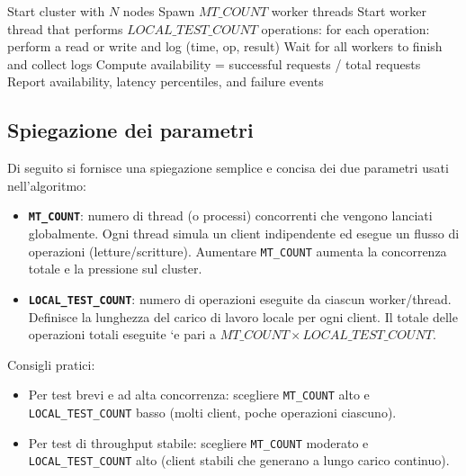 \documentclass{article}
\begin{document}
\begin{algorithm}
\caption{Availability Test (simplified)}
\begin{algorithmic}[1]
    \State Start cluster with $N$ nodes
    \State Spawn $MT\_COUNT$ worker threads
        \State Start worker thread that performs $LOCAL\_TEST\_COUNT$ operations:
        \State \quad for each operation: perform a read or write and log (time, op, result)
    \EndFor
    \State Wait for all workers to finish and collect logs
    \State Compute availability = successful requests / total requests
    \State Report availability, latency percentiles, and failure events
\EndProcedure
\end{algorithmic}
\end{algorithm}

\subsection*{Spiegazione dei parametri}
Di seguito si fornisce una spiegazione semplice e concisa dei due parametri usati nell'algoritmo:
\begin{itemize}
    \item \textbf{\texttt{MT\_COUNT}}: numero di thread (o processi) concorrenti che vengono lanciati globalmente. Ogni thread simula un client indipendente ed esegue un flusso di operazioni (letture/scritture). Aumentare \texttt{MT\_COUNT} aumenta la concorrenza totale e la pressione sul cluster.
    \item \textbf{\texttt{LOCAL\_TEST\_COUNT}}: numero di operazioni eseguite da ciascun worker/thread. Definisce la lunghezza del carico di lavoro locale per ogni client. Il totale delle operazioni totali eseguite `e pari a $MT\_COUNT \times LOCAL\_TEST\_COUNT$.
\end{itemize}

\noindent Consigli pratici:
\begin{itemize}
    \item Per test brevi e ad alta concorrenza: scegliere \texttt{MT\_COUNT} alto e \texttt{LOCAL\_TEST\_COUNT} basso (molti client, poche operazioni ciascuno).
    \item Per test di throughput stabile: scegliere \texttt{MT\_COUNT} moderato e \texttt{LOCAL\_TEST\_COUNT} alto (client stabili che generano a lungo carico continuo).
\end{itemize}
\end{document}

